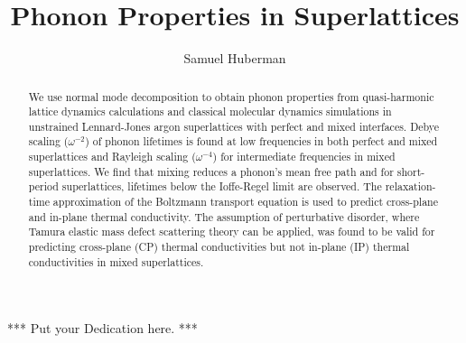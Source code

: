 \documentclass[12pt,doublespaced]{ut-thesis}
\author{Samuel Huberman}
\title{Phonon Properties in Superlattices}
\begin{document}
\begin{preliminary}

\maketitle


\begin{abstract}
We use normal mode decomposition to obtain phonon properties from quasi-harmonic lattice dynamics calculations and classical molecular dynamics simulations in unstrained Lennard-Jones argon superlattices with perfect and mixed interfaces. Debye scaling ($\omega^{-2}$) of phonon lifetimes is found at low frequencies in both perfect and mixed superlattices and Rayleigh scaling ($\omega^{-4}$) for intermediate frequencies in mixed superlattices. We find that mixing reduces a phonon's mean free path and for short-period superlattices, lifetimes below the Ioffe-Regel limit are observed. The relaxation-time approximation of the Boltzmann transport equation is used to predict cross-plane and in-plane thermal conductivity. The assumption of perturbative disorder, where Tamura elastic mass defect scattering theory can be applied, was found to be valid for predicting cross-plane (CP) thermal conductivities but not in-plane (IP) thermal conductivities in mixed superlattices.
\end{abstract}


 *** Put your Dedication here. ***


\end{preliminary}
\end{document}
